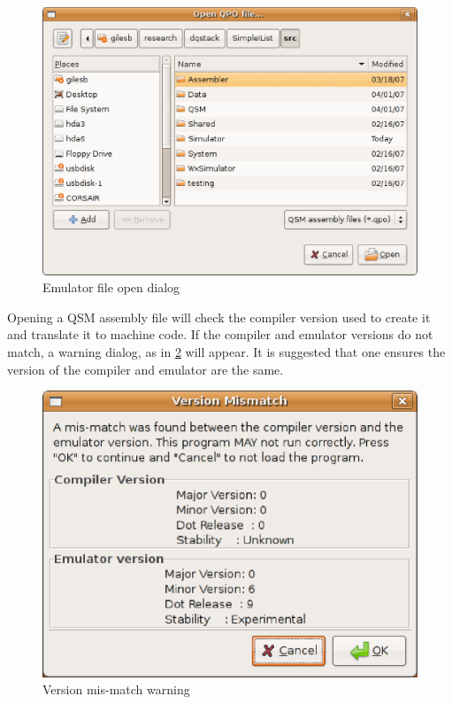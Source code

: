\begin{figure}[htbp]
\centering
\includegraphics[scale=.5]{images/emulator/OpenDialog.eps}
\caption{Emulator file open dialog}\label{fig:emfileopen}
\end{figure}

Opening a QSM assembly file will check the compiler version 
used to create it and translate it to machine code. If the compiler and
emulator versions do not match, a warning dialog, as 
in \ref{fig:emversionmismatch} will appear. It is suggested that one 
ensures the version of the compiler and emulator are the same. 

\begin{figure}[htbp]
\centering
\includegraphics[scale=.5]{images/emulator/VersionMismatch.eps}
\caption{Version mis-match warning}\label{fig:emversionmismatch}
\end{figure}

